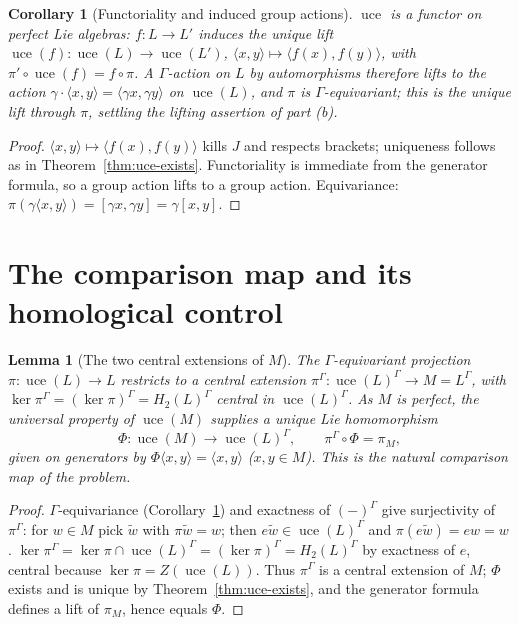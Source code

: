 \documentclass{amsart}
\newtheorem{lemma}{Lemma}
\newtheorem{corollary}{Corollary}
\theoremstyle{definition}
\DeclareMathOperator{\uce}{uce}
\newcommand{\Gm}{\Gamma}
\newcommand{\ra}{\rightarrow}
\begin{document}
\begin{corollary}[Functoriality and induced group actions]\label{cor:funct}
$\uce$ is a functor on perfect Lie algebras: $f\colon L\ra L'$ induces the unique
lift $\uce(f)\colon\uce(L)\ra\uce(L')$,
$\langle x,y\rangle\mapsto\langle f(x),f(y)\rangle$, with
$\pi'\circ\uce(f)=f\circ\pi$.  A $\Gm$-action on $L$ by automorphisms therefore
lifts to the action $\gamma\cdot\langle x,y\rangle=\langle\gamma x,\gamma
y\rangle$ on $\uce(L)$, and $\pi$ is $\Gm$-equivariant; this is the unique lift
through $\pi$, settling the lifting assertion of part (b).
\end{corollary}
\begin{proof}
$\langle x,y\rangle\mapsto\langle f(x),f(y)\rangle$ kills $J$ and respects
brackets; uniqueness follows as in Theorem~\ref{thm:uce-exists}.  Functoriality is
immediate from the generator formula, so a group action lifts to a group action.
Equivariance: $\pi(\gamma\langle x,y\rangle)=[\gamma x,\gamma y]=\gamma[x,y]$.
\end{proof}

\section{The comparison map and its homological control}

\begin{lemma}[The two central extensions of $M$]\label{lem:two-ext}
The $\Gm$-equivariant projection $\pi\colon\uce(L)\ra L$ restricts to a central
extension
$\pi^{\Gm}\colon \uce(L)^{\Gm}\ra M=L^{\Gm}$, with
$\ker\pi^{\Gm}=(\ker\pi)^{\Gm}=H_2(L)^{\Gm}$ central in $\uce(L)^{\Gm}$.  As $M$ is
perfect, the universal property of $\uce(M)$ supplies a unique Lie homomorphism
\[
   \Phi\colon\uce(M)\longrightarrow\uce(L)^{\Gm},\qquad \pi^{\Gm}\circ\Phi=\pi_M,
\]
given on generators by $\Phi\langle x,y\rangle=\langle x,y\rangle$ ($x,y\in M$).
This is the natural comparison map of the problem.
\end{lemma}
\begin{proof}
$\Gm$-equivariance (Corollary~\ref{cor:funct}) and exactness of $(-)^{\Gm}$ give
surjectivity of $\pi^{\Gm}$: for $w\in M$ pick $\widetilde w$ with
$\pi\widetilde w=w$; then $e\widetilde w\in\uce(L)^{\Gm}$ and
$\pi(e\widetilde w)=ew=w$.  $\ker\pi^{\Gm}=\ker\pi\cap\uce(L)^{\Gm}=
(\ker\pi)^{\Gm}=H_2(L)^{\Gm}$ by exactness of $e$, central because
$\ker\pi=Z(\uce(L))$.  Thus $\pi^{\Gm}$ is a central extension of $M$; $\Phi$
exists and is unique by Theorem~\ref{thm:uce-exists}, and the generator formula
defines a lift of $\pi_M$, hence equals $\Phi$.
\end{proof}
\end{document}
